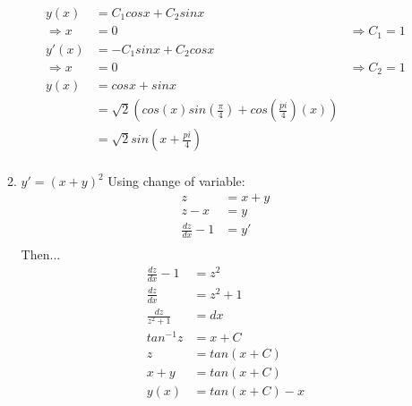 \documentclass{article}
\begin{document}
\begin{enumerate}
\begin{enumerate}
                    \begin{align*}
                        y(x)&=C_1cosx+C_2sinx \\
                        \Rightarrow x&=0 &\Rightarrow C_1=1 \\
                        y'(x)&=-C_1sinx+C_2cosx \\
                        \Rightarrow x&=0 &\Rightarrow C_2=1 \\
                        y(x)&=cosx+sinx \\
                        &=\sqrt{2}(cos(x)sin(\frac{\pi}{4})+cos(\frac{pi}{4})(x)) \\
                        &=\sqrt{2}sin(x+\frac{pi}{4}) \\
                    \end{align*}
                    \item \textit{$y'=(x+y)^2$}
                    Using change of variable:
                    \begin{align*}
                        z&=x+y \\
                        z-x&=y \\
                        \frac{dz}{dx}-1&=y' \\
                    \end{align*}
                    Then...
                    \begin{align*}
                        \frac{dz}{dx}-1&=z^2 \\
                        \frac{dz}{dx}&=z^2+1 \\
                        \frac{dz}{z^2+1}&=dx \\
                        tan^{-1}z&=x+C \\
                        z&=tan(x+C) \\
                        x+y&=tan(x+C) \\
                        y(x)&=tan(x+C)-x \\
                    \end{align*}
                \end{enumerate}
        \end{enumerate}
\end{document}
